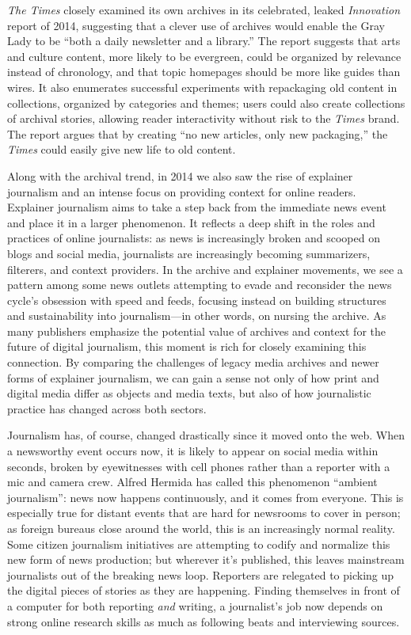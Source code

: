 \emph{The Times} closely examined its own archives in its celebrated, leaked \emph{Innovation} report of 2014, suggesting that a clever use of archives would enable the Gray Lady to be ``both a daily newsletter and a library.''\autocite[28]{_innovation_2014} The report suggests that arts and culture content, more likely to be evergreen, could be organized by relevance instead of chronology, and that topic homepages should be more like guides than wires. It also enumerates successful experiments with repackaging old content in collections, organized by categories and themes; users could also create collections of archival stories, allowing reader interactivity without risk to the \emph{Times} brand. The report argues that by creating ``no new articles, only new packaging,'' the \emph{Times} could easily give new life to old content.\autocite[34]{_innovation_2014}

Along with the archival trend, in 2014 we also saw the rise of explainer journalism and an intense focus on providing context for online readers. Explainer journalism aims to take a step back from the immediate news event and place it in a larger phenomenon. It reflects a deep shift in the roles and practices of online journalists: as news is increasingly broken and scooped on blogs and social media, journalists are increasingly becoming summarizers, filterers, and context providers. In the archive and explainer movements, we see a pattern among some news outlets attempting to evade and reconsider the news cycle's obsession with speed and feeds, focusing instead on building structures and sustainability into journalism---in other words, on nursing the archive. As many publishers emphasize the potential value of archives and context for the future of digital journalism, this moment is rich for closely examining this connection. By comparing the challenges of legacy media archives and newer forms of explainer journalism, we can gain a sense not only of how print and digital media differ as objects and media texts, but also of how journalistic practice has changed across both sectors.

Journalism has, of course, changed drastically since it moved onto the web. When a newsworthy event occurs now, it is likely to appear on social media within seconds, broken by eyewitnesses with cell phones rather than a reporter with a mic and camera crew. Alfred Hermida has called this phenomenon ``ambient journalism'': news now happens continuously, and it comes from everyone.\autocite{hermida_twittering_2010} This is especially true for distant events that are hard for newsrooms to cover in person; as foreign bureaus close around the world, this is an increasingly normal reality. Some citizen journalism initiatives are attempting to codify and normalize this new form of news production;\autocite{zuckerman_international_2010} but wherever it's published, this leaves mainstream journalists out of the breaking news loop. Reporters are relegated to picking up the digital pieces of stories as they are happening. Finding themselves in front of a computer for both reporting \emph{and} writing, a journalist's job now depends on strong online research skills as much as following beats and interviewing sources.

